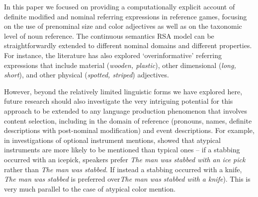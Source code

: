 \documentclass[11pt]{article}
\begin{document}
In this paper we focused on providing a computationally explicit account of definite modified and nominal referring expressions in reference games, focusing on the use of prenominal size and color adjectives as well as on the taxonomic level of noun reference. The continuous semantics RSA model can be straightforwardly extended to different  nominal domains and different properties. For instance, the literature has also explored `overinformative' referring expressions that include material (\emph{wooden, plastic}), other dimensional (\emph{long, short}), and other physical (\emph{spotted, striped}) adjectives. 



However, beyond the relatively limited linguistic forms we have explored here, future research should also investigate the very intriguing potential for this approach to be extended to any language production phenomenon that involves content selection, including in the domain of reference (pronouns, names, definite descriptions with post-nominal modification) and event descriptions. For example, in investigations of optional instrument mentions,  showed that atypical instruments are more likely to be mentioned than typical ones -- if a stabbing occurred with an icepick, speakers prefer \emph{The man was stabbed with an ice pick} rather than \emph{The man was stabbed}. If instead a stabbing occurred with a knife, \emph{The man was stabbed} is preferred over\emph{The man was stabbed with a knife}). This is very much parallel to the case of atypical color mention. %
\end{document}
